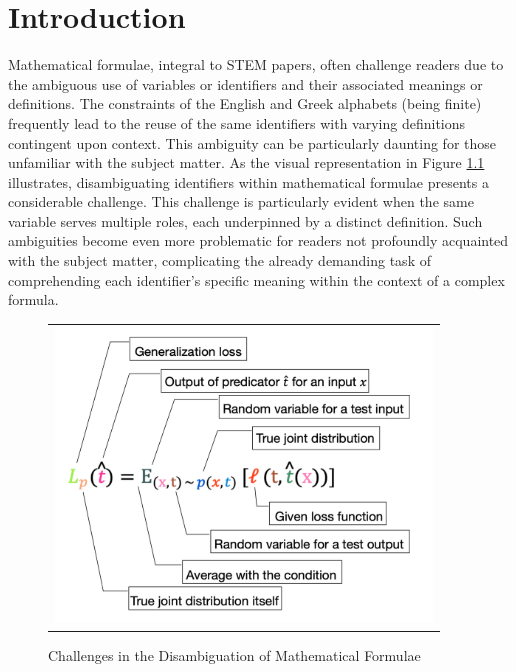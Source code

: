 \chapter{Introduction}\label{chapter:introduction}

Mathematical formulae, integral to \ac{STEM} papers, often challenge readers due to the ambiguous use of variables or identifiers and their associated meanings or definitions. The constraints of the English and Greek alphabets (being finite) frequently lead to the reuse of the same identifiers with varying definitions contingent upon context. This ambiguity can be particularly daunting for those unfamiliar with the subject matter. As the visual representation in Figure \ref{fig:introduction-motivation} illustrates, disambiguating identifiers within mathematical formulae presents a considerable challenge. This challenge is particularly evident when the same variable serves multiple roles, each underpinned by a distinct definition. Such ambiguities become even more problematic for readers not profoundly acquainted with the subject matter, complicating the already demanding task of comprehending each identifier's specific meaning within the context of a complex formula.

\begin{figure}[htpb]
  \centering
  \begin{tabular}{c}
    \includegraphics[width=10cm]{images/introduction-motivation.png}
  \end{tabular}
  \caption[Challenges in Disambiguation]{Challenges in the Disambiguation of Mathematical Formulae}\label{fig:introduction-motivation}
\end{figure}


